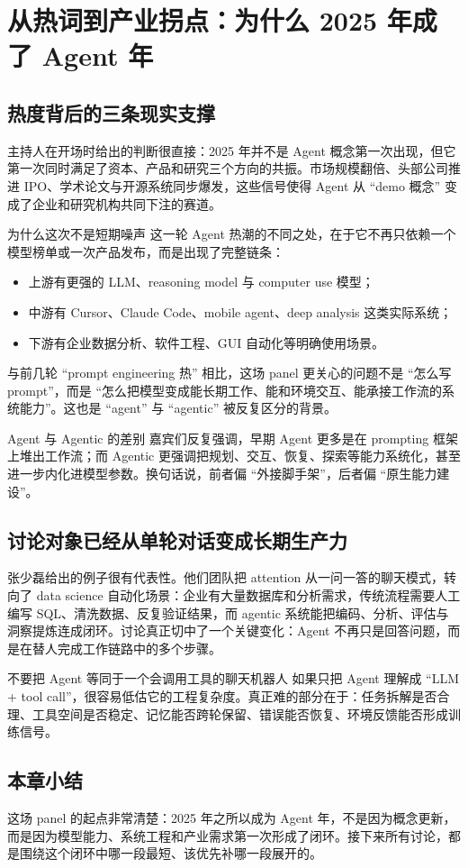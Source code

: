 \section{从热词到产业拐点：为什么 2025 年成了 Agent 年}

\subsection{热度背后的三条现实支撑}
主持人在开场时给出的判断很直接：2025 年并不是 Agent 概念第一次出现，但它第一次同时满足了资本、产品和研究三个方向的共振。市场规模翻倍、头部公司推进 IPO、学术论文与开源系统同步爆发，这些信号使得 Agent 从 ``demo 概念'' 变成了企业和研究机构共同下注的赛道。

\begin{importantbox}{为什么这次不是短期噪声}
这一轮 Agent 热潮的不同之处，在于它不再只依赖一个模型榜单或一次产品发布，而是出现了完整链条：
\begin{itemize}
  \item 上游有更强的 LLM、reasoning model 与 computer use 模型；
  \item 中游有 Cursor、Claude Code、mobile agent、deep analysis 这类实际系统；
  \item 下游有企业数据分析、软件工程、GUI 自动化等明确使用场景。
\end{itemize}
\end{importantbox}

与前几轮 ``prompt engineering 热'' 相比，这场 panel 更关心的问题不是 ``怎么写 prompt''，而是 ``怎么把模型变成能长期工作、能和环境交互、能承接工作流的系统能力''。这也是 ``agent'' 与 ``agentic'' 被反复区分的背景。

\begin{knowledgebox}{Agent 与 Agentic 的差别}
嘉宾们反复强调，早期 Agent 更多是在 prompting 框架上堆出工作流；而 Agentic 更强调把规划、交互、恢复、探索等能力系统化，甚至进一步内化进模型参数。换句话说，前者偏 ``外接脚手架''，后者偏 ``原生能力建设''。
\end{knowledgebox}

\subsection{讨论对象已经从单轮对话变成长期生产力}
张少磊给出的例子很有代表性。他们团队把 attention 从一问一答的聊天模式，转向了 data science 自动化场景：企业有大量数据库和分析需求，传统流程需要人工编写 SQL、清洗数据、反复验证结果，而 agentic 系统能把编码、分析、评估与洞察提炼连成闭环。讨论真正切中了一个关键变化：Agent 不再只是回答问题，而是在替人完成工作链路中的多个步骤。

\begin{warningbox}{不要把 Agent 等同于一个会调用工具的聊天机器人}
如果只把 Agent 理解成 ``LLM + tool call''，很容易低估它的工程复杂度。真正难的部分在于：任务拆解是否合理、工具空间是否稳定、记忆能否跨轮保留、错误能否恢复、环境反馈能否形成训练信号。
\end{warningbox}

\subsection{本章小结}
这场 panel 的起点非常清楚：2025 年之所以成为 Agent 年，不是因为概念更新，而是因为模型能力、系统工程和产业需求第一次形成了闭环。接下来所有讨论，都是围绕这个闭环中哪一段最短、该优先补哪一段展开的。

